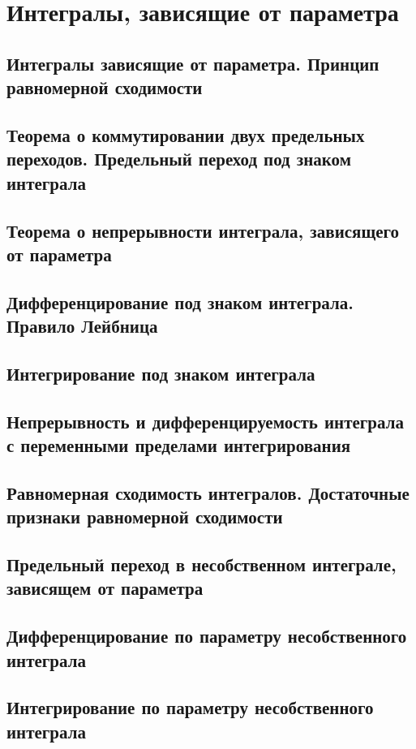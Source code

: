 \documentclass[a4paper]{article}
\theoremstyle{definition}
\theoremstyle{remark}
\begin{document}
    \tableofcontents
    \section{Интегралы, зависящие от параметра}
    \subsection{	Интегралы зависящие от параметра. Принцип равномерной сходимости}
    \subsection{	Теорема о коммутировании двух предельных переходов. Предельный переход под  знаком интеграла}
    \subsection{	Теорема о непрерывности интеграла, зависящего от параметра}
    \subsection{	Дифференцирование под знаком интеграла. Правило Лейбница}
    \subsection{	Интегрирование под знаком интеграла}
    \subsection{	Непрерывность и дифференцируемость интеграла с переменными пределами интегрирования}
    \subsection{	Равномерная сходимость интегралов. Достаточные признаки равномерной сходимости}
    \subsection{	Предельный переход в несобственном интеграле, зависящем от параметра}
    \subsection{	Дифференцирование  по параметру несобственного интеграла}
    \subsection{	Интегрирование по параметру несобственного интеграла}
    
\end{document}
